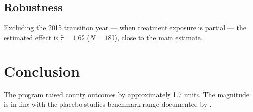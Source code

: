 \documentclass[12pt]{article}
\begin{document}
\subsection{Robustness}

Excluding the 2015 transition year --- when treatment exposure is
partial --- the estimated effect is $\hat{\tau} = 1.62$ ($N = 180$),
close to the main estimate.

\section{Conclusion}

The program raised county outcomes by approximately 1.7 units. The
magnitude is in line with the placebo-studies benchmark range documented
by \citet{smith2019placebo}.



\end{document}
